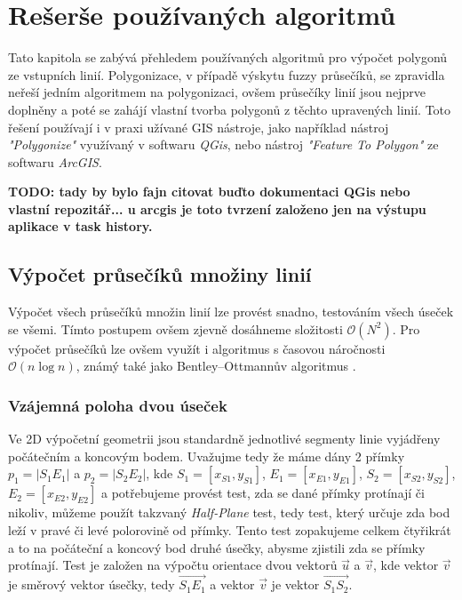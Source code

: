 \chapter{Rešerše používaných algoritmů}
Tato kapitola se zabývá přehledem používaných algoritmů pro výpočet polygonů ze vstupních linií. Polygonizace, v případě výskytu fuzzy průsečíků, se zpravidla neřeší jedním algoritmem na polygonizaci, ovšem průsečíky linií jsou nejprve doplněny a poté se zahájí vlastní tvorba polygonů z těchto upravených linií. Toto řešení používají i v praxi užívané GIS nástroje, jako například nástroj \textit{"Polygonize"} využívaný v softwaru \textit{QGis}, nebo nástroj \textit{"Feature To Polygon"} ze softwaru \textit{ArcGIS}.

\textbf{TODO: tady by bylo fajn citovat buďto dokumentaci QGis nebo vlastní repozitář... u arcgis je toto tvrzení založeno jen na výstupu aplikace v task history.}

\section{Výpočet průsečíků množiny linií}
Výpočet všech průsečíků množin linií lze provést snadno, testováním všech úseček se všemi. Tímto postupem ovšem zjevně dosáhneme složitosti $\mathcal{O}(N^2)$. Pro výpočet průsečíků lze ovšem využít i algoritmus s časovou náročnosti $\mathcal{O}(n\log{}n)$, známý také jako Bentley–Ottmannův algoritmus \cite{bentley1979algorithms}.

\subsection{Vzájemná poloha dvou úseček}
Ve 2D výpočetní geometrii jsou standardně jednotlivé segmenty linie vyjádřeny počátečním a koncovým bodem. Uvažujme tedy že máme dány 2 přímky $p_1 = |S_1 E_1|$ a $p_2 = |S_2 E_2|$, kde $S_1 = [x_{S1},y_{S1}]$, $E_1 = [x_{E1},y_{E1}]$, $S_2 = [x_{S2},y_{S2}]$, $E_2 = [x_{E2},y_{E2}]$ a potřebujeme provést test, zda se dané přímky protínají či nikoliv, můžeme použít takzvaný \textit{Half-Plane} test, tedy test, který určuje zda bod leží v pravé či levé polorovině od přímky. Tento test zopakujeme celkem čtyřikrát a to na počáteční a koncový bod druhé úsečky, abysme zjistili zda se přímky protínají. Test je založen na výpočtu orientace dvou vektorů $\vec{u}$  a $\vec{v}$, kde vektor $\vec{v}$ je směrový vektor úsečky, tedy $\overrightarrow{S_1E_1}$ a vektor $\vec{v}$ je vektor $\overrightarrow{S_1S_2}$.

	

